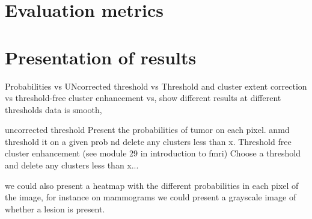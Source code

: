 \section{Evaluation metrics}

\section{Presentation of results}
Probabilities vs UNcorrected threshold vs Threshold and cluster extent correction vs threshold-free cluster enhancement vs, show different results at different thresholds
data is smooth, 

uncorrected threshold
Present the probabilities of tumor on each pixel. anmd threshold it on a given prob nd delete any clusters less than x.
Threshold free cluster enhancement (see module 29 in introduction to fmri)
Choose a threshold and delete any clusters less than x...

we could also present a heatmap with the different probabilities in each pixel of the image, for instance on mammograms we could present a grayscale image of whether a lesion is present.


